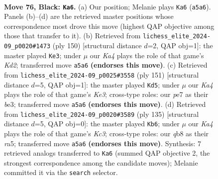 \documentclass[11pt]{article}
\begin{document}
\clearpage

\begin{figure}[p]\centering
\begin{subfigure}{0.46\textwidth}\centering
\resizebox{\linewidth}{!}{%
\newchessgame
\chessboard[
  setfen={1Q6/4P1P1/8/k6P/8/8/4K3/8 b - - 0 76},
  showmover=false,
  pgfstyle=straightmove, color=movearrow, markmove={a5-a6}
]}
\caption{}
\end{subfigure}\hfill
\begin{subfigure}{0.46\textwidth}\centering
\resizebox{\linewidth}{!}{%
\newchessgame
\chessboard[
  setfen={8/p4p2/8/8/8/k7/3K4/1q6 w - - 0 76},
  showmover=false,
  pgfstyle=straightmove, color=movearrow, markmove={d2-e3}
]}
\caption{}
\end{subfigure}
\\[4pt]
\begin{subfigure}{0.46\textwidth}\centering
\resizebox{\linewidth}{!}{%
\newchessgame
\chessboard[
  setfen={5Q2/1K6/4k3/PP6/4p3/4B3/8/8 b - - 10 76},
  showmover=false,
  pgfstyle=straightmove, color=movearrow, markmove={e6-d5}
]}
\caption{}
\end{subfigure}\hfill
\begin{subfigure}{0.46\textwidth}\centering
\resizebox{\linewidth}{!}{%
\newchessgame
\chessboard[
  setfen={4K3/8/2k5/R7/8/1P5P/8/8 b - - 0 68},
  showmover=false,
  pgfstyle=straightmove, color=movearrow, markmove={c6-b6}
]}
\caption{}
\end{subfigure}
\caption{\textbf{Move 76, Black: \texttt{Ka6}.} (a) Our position; Melanie plays \texttt{Ka6} (\texttt{a5a6}). Panels (b)--(d) are the retrieved master positions whose correspondence most drove this move (highest QAP objective among those that transfer to it). (b) Retrieved from \texttt{lichess\_elite\_2024-09\_p0020\#1473} (ply 150) [structural distance $d$=2, QAP obj=1]: the master played \texttt{Ke3}; under $\mu$ our \emph{Ka4} plays the role of that game's \emph{Kd2}; transferred move \texttt{a5a6} \textbf{(endorses this move)}. (c) Retrieved from \texttt{lichess\_elite\_2024-09\_p0025\#3558} (ply 151) [structural distance $d$=5, QAP obj=1]: the master played \texttt{Kd5}; under $\mu$ our \emph{Ka4} plays the role of that game's \emph{Ke3}; cross-type roles: our \emph{p}e7 as their \emph{b}e3; transferred move \texttt{a5a6} \textbf{(endorses this move)}. (d) Retrieved from \texttt{lichess\_elite\_2024-09\_p0020\#3589} (ply 135) [structural distance $d$=5, QAP obj=0]: the master played \texttt{Kb6}; under $\mu$ our \emph{Ka4} plays the role of that game's \emph{Kc3}; cross-type roles: our \emph{q}b8 as their \emph{r}a5; transferred move \texttt{a5a6} \textbf{(endorses this move)}. Synthesis: 7 retrieved analogs transferred to \texttt{Ka6} (summed QAP objective 2, the strongest correspondence among the candidate moves); Melanie committed it via the \texttt{search} selector.}
\label{fig:thought-m151}
\end{figure}
\end{document}
